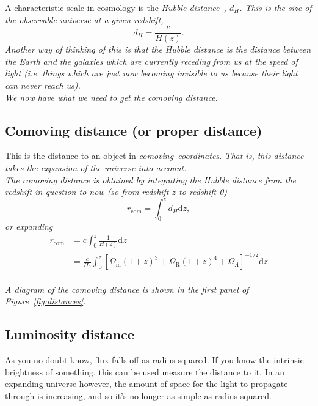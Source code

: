 \documentclass[]{article}
\begin{document}
\noindent A characteristic scale in cosmology is the \itshape Hubble distance~\upshape, $d_H$. This is the size of the observable universe at a given redshift,
\begin{equation}
d_H = \frac{c}{H(z)}.
\end{equation}
Another way of thinking of this is that the Hubble distance is the distance between the Earth and the galaxies which are currently receding from us at the speed of light (i.e. things which are just now becoming invisible to us because their light can never reach us). \\

\noindent We now have what we need to get the comoving distance.

\subsection{Comoving distance (or proper distance)}

This is the distance to an object in \itshape comoving~\upshape coordinates. That is, this distance takes the expansion of the universe into account. \\

\noindent The comoving distance is obtained by integrating the Hubble distance from the redshift in question to now (so from redshift $z$ to redshift 0)
\begin{equation}
r_\mathrm{com} = \int_0^z d_H \mathrm{d}z,
\end{equation}
or expanding
\begin{equation}
\boxed{
\begin{split}
r_\mathrm{com} &= c\int_0^z \frac{1}{H(z)}\mathrm{d}z\\
&= \frac{c}{H_0}\int_0^z [\Omega_\mathrm{m} (1+z)^{3}+\Omega_\mathrm{R} (1+z)^{4}+\Omega_\Lambda]^{-1/2}\mathrm{d}z
\end{split}
}
\end{equation}\\

\noindent A diagram of the comoving distance is shown in the first panel of Figure~\ref{fig:distances}.

\subsection{Luminosity distance}

As you no doubt know, flux falls off as radius squared. If you know the intrinsic brightness of something, this can be used measure the distance to it. In an expanding universe however, the amount of space for the light to propagate through is increasing, and so it’s no longer as simple as radius squared. \\
\end{document}
